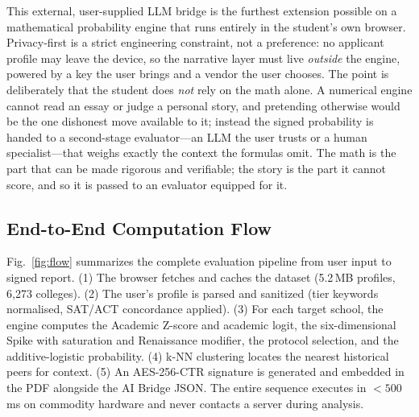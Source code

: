 \documentclass[conference]{IEEEtran}
\begin{document}
This external, user-supplied LLM bridge is the furthest extension possible on a mathematical probability engine that runs entirely in the student's own browser. Privacy-first is a strict engineering constraint, not a preference: no applicant profile may leave the device, so the narrative layer must live \emph{outside} the engine, powered by a key the user brings and a vendor the user chooses. The point is deliberately that the student does \emph{not} rely on the math alone. A numerical engine cannot read an essay or judge a personal story, and pretending otherwise would be the one dishonest move available to it; instead the signed probability is handed to a second-stage evaluator---an LLM the user trusts or a human specialist---that weighs exactly the context the formulas omit. The math is the part that can be made rigorous and verifiable; the story is the part it cannot score, and so it is passed to an evaluator equipped for it.

\subsection{End-to-End Computation Flow}
Fig.~\ref{fig:flow} summarizes the complete evaluation pipeline from user input to signed report. (1) The browser fetches and caches the dataset (5.2\,MB profiles, 6,273 colleges). (2) The user's profile is parsed and sanitized (tier keywords normalised, SAT/ACT concordance applied). (3) For each target school, the engine computes the Academic Z-score and academic logit, the six-dimensional Spike with saturation and Renaissance modifier, the protocol selection, and the additive-logistic probability. (4) k-NN clustering locates the nearest historical peers for context. (5) An AES-256-CTR signature is generated and embedded in the PDF alongside the AI Bridge JSON. The entire sequence executes in $<500$\,ms on commodity hardware and never contacts a server during analysis.
\end{document}
